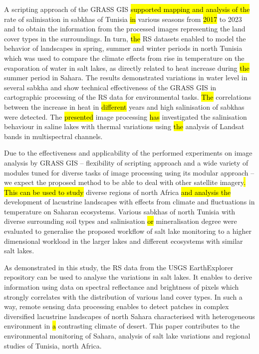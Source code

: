 \documentclass[land,article,submit,pdftex,moreauthors]{Definitions/mdpi}
\begin{document}
A scripting approach of the GRASS GIS \hl{supported mapping and analysis of the} rate of salinisation in sabkhas of Tunisia \hl{in} various seasons from \hl{2017} to 2023 and to obtain the information from the processed images representing the land cover types in the surroundings. In turn, \hl{the }RS datasets enabled to model the behavior of landscapes in spring, summer and winter periods in north Tunisia which was used to compare the climate effects from rise in temperature on the evaporation of water in salt lakes, as directly related to heat increase during \hl{the }summer period in Sahara. The results demonstrated variations in water level in several sabkha and show technical effectiveness of the GRASS GIS in cartographic processing of the RS data for environmental tasks. \hl{The }correlations between the increase in heat in \hl{different} years and high salinisation of sabkhas were detected. The \hl{presented }image processing \hl{has} investigated the salinisation behaviour in saline lakes with thermal variations using \hl{the }analysis of Landsat bands in multispectral channels. 

Due to the effectiveness and applicability of the performed experiments on image analysis by GRASS GIS -- flexibility of scripting approach and a wide variety of modules tuned for diverse tasks of image processing using its modular approach -- we expect the proposed method to be able to deal with other satellite imagery\hl{. This can be used to study} diverse regions of north Africa \hl{and analysis the }development of lacustrine landscapes with effects from climate and fluctuations in temperature on Saharan ecosystems. Various sabkhas of north Tunisia with diverse surrounding soil types and salinisation \hl{or} mineralisation degree were evaluated to generalise the proposed workflow of salt lake monitoring to a higher dimensional workload in the larger lakes and different\hl{ }ecosystems with similar salt lakes. 

As demonstrated in this study, the RS data from the USGS EarthExplorer repository can be used to analyse the variations in salt lakes. It enables to derive information using data on spectral reflectance and brightness of pixels which strongly correlates with the distribution of various land cover types. In such a way, remote sensing data processing enables to detect patches in complex diversified lacustrine landscapes of north Sahara characterised with heterogeneous environment in \hl{a} contrasting climate of desert. This paper contributes to the environmental monitoring of Sahara, analysis of salt lake variations and regional studies of Tunisia, north Africa.
\end{document}

